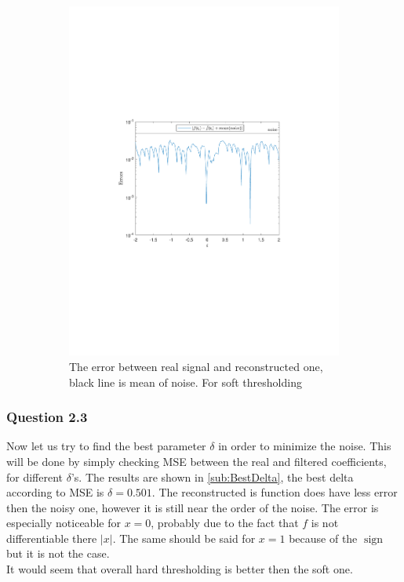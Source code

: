 \documentclass[a4paper]{article}
\DeclareMathOperator*{\sign}{sign}
\begin{document}
\begin{figure}[H]
\begin{subfigure}{0.49\textwidth}
\includegraphics[trim={3.5cm 8cm 4cm 9cm},clip,width=1\textwidth]{Images/Delta=0.1Soft.pdf}
\caption{The error between real signal and reconstructed one, black line is mean of noise. For soft thresholding}
\label{sub:Delta=0.1BetterSoft}
\end{subfigure}
\caption{}
\end{figure}


    \subsubsection{Question 2.3}

	Now let us try to find the best parameter $\delta$ in order to minimize the noise. This will be done by simply checking MSE between the real and filtered coefficients, for different $\delta$'s. The results are shown in \cref{sub:BestDelta}, the best delta according to MSE is $\delta = 0.501$. The reconstructed is function does have less error then the noisy one, however it is still near the order of the noise. The error is especially noticeable for $x = 0$, probably due to the fact that $f$ is not differentiable there $|x|$. The same should be said for $x = 1$ because of the $\sign$ but it is not the case.\\
	It would seem that overall hard thresholding is better then the soft one.
\end{document}

